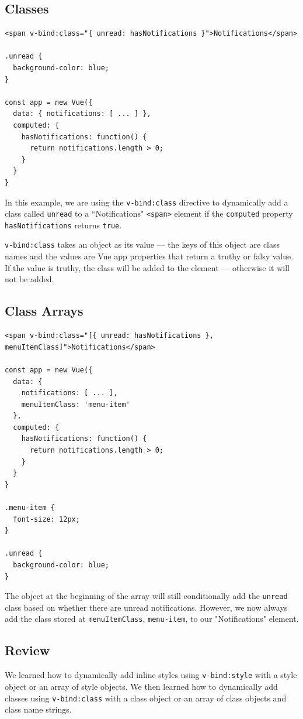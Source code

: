 \documentclass[a4paper, 12pt]{article}
\begin{document}
\subsection{Classes}
\begin{verbatim}
<span v-bind:class="{ unread: hasNotifications }">Notifications</span>

.unread {
  background-color: blue;
}

const app = new Vue({
  data: { notifications: [ ... ] },
  computed: {
    hasNotifications: function() {
      return notifications.length > 0;
    }
  }
}
\end{verbatim}
In this example, we are using the \verb|v-bind:class| directive to dynamically add a class called \verb|unread| to a ``Notifications" \verb|<span>| element if the \verb|computed| property \verb|hasNotifications| returns \verb|true|.

\verb|v-bind:class| takes an object as its value — the keys of this object are class names and the values are Vue app properties that return a truthy or falsy value. If the value is truthy, the class will be added to the element — otherwise it will not be added.

\subsection{Class Arrays}
\begin{verbatim}
<span v-bind:class="[{ unread: hasNotifications }, menuItemClass]">Notifications</span>

const app = new Vue({
  data: { 
    notifications: [ ... ],
    menuItemClass: 'menu-item'
  },
  computed: {
    hasNotifications: function() {
      return notifications.length > 0;
    }
  }
}

.menu-item {
  font-size: 12px;
}

.unread {
  background-color: blue;
}
\end{verbatim}
The object at the beginning of the array will still conditionally add the \verb|unread| class based on whether there are unread notifications. However, we now always add the class stored at \verb|menuItemClass|, \verb|menu-item|, to our "Notifications" element.

\subsection{Review}
We learned how to dynamically add inline styles using \verb|v-bind:style| with a style object or an array of style objects. We then learned how to dynamically add classes using \verb|v-bind:class| with a class object or an array of class objects and class name strings.
\end{document}
